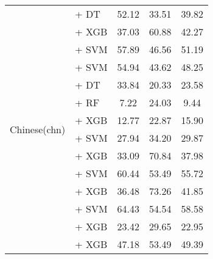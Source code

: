 \begin{longtable}{llccc}
    \midrule
    \multirow{14}{*}{Chinese(chn)}        & \citep{li2024conanembeddinggeneraltextembedding} + DT              & 52.12                                & 33.51              & 39.82             \\
                                          & \citep{li2024conanembeddinggeneraltextembedding} + XGB             & 37.03                                & 60.88              & 42.27             \\
                                          & \citep{li2024conanembeddinggeneraltextembedding} + SVM             & 57.89                                & 46.56              & 51.19             \\
                                          & \citep{wang2024multilingual} + SVM                                 & 54.94                                & 43.62              & 48.25             \\
                                          & \citep{zhang2024gme} + DT                                          & 33.84                                & 20.33              & 23.58             \\
                                          & \citep{zhang2024gme} + RF                                          & 7.22                                & 24.03              & 9.44             \\
                                          & \citep{zhang2024gme} + XGB                                         & 12.77                                & 22.87              & 15.90             \\
                                          & \citep{zhang2024gme} + SVM                                         & 27.94                                & 34.20              & 29.87             \\
                                          & \citep{lier0072023xiaobuembeddingv2} + XGB                         & 33.09                                & 70.84              & 37.98             \\
                                          & \citep{lier0072023xiaobuembeddingv2} + SVM                         & 60.44                                & 53.49              & 55.72             \\
                                          & \citep{zpoint-large-embedding-zh} + XGB                            & 36.48                                & 73.26              & 41.85             \\
                                          & \citep{zpoint-large-embedding-zh} + SVM                            & 64.43                                & 54.54              & 58.58             \\
                                          & \citep{all-MiniLM-L12-v2} + XGB                                    & 23.42                                & 29.65              & 22.95             \\
                                          & \citep{sturua2024jinaembeddingsv3multilingualembeddingstask} + XGB & 47.18                                & 53.49              & 49.39             \\


\end{longtable}
